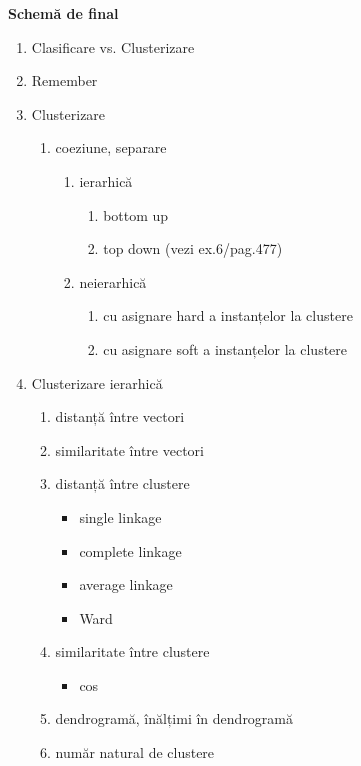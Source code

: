 \documentclass[12pt]{article}
\begin{document}
	\newpage
	\textbf{\large{Schemă de final}}
	\begin{enumerate}
		\item Clasificare vs. Clusterizare
		\item Remember
		\item Clusterizare
		\begin{enumerate}
			\item coeziune, separare
			\begin{enumerate}
				\item ierarhică
				\begin{enumerate}
					\item bottom up
					\item top down (vezi ex.6/pag.477)
				\end{enumerate}
				\item neierarhică
				\begin{enumerate}
					\item cu asignare hard a instanțelor la clustere
					\item cu asignare soft a instanțelor la clustere
				\end{enumerate}
			\end{enumerate}
		\end{enumerate}
		\item Clusterizare ierarhică
		\begin{enumerate}
			\item distanță între vectori
			\item similaritate între vectori
			\item distanță între clustere
			\begin{itemize}
				\item single linkage
				\item complete linkage
				\item average linkage
				\item Ward
			\end{itemize}
			\item similaritate între clustere
			\begin{itemize}
				\item cos
			\end{itemize}
			\item dendrogramă, înălțimi în dendrogramă
			\item număr natural de clustere
		\end{enumerate}
	\end{enumerate}
	

	
\end{document}

